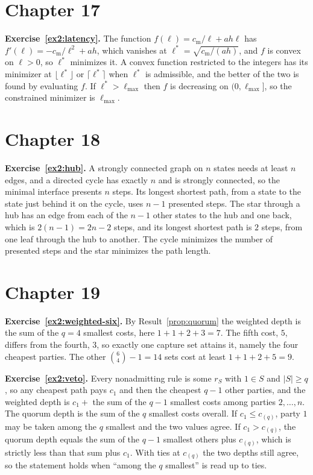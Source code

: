 \section*{Chapter 17}

\textbf{Exercise~\ref{ex2:latency}.} The function $f(\ell)=c_{\mathrm m}/\ell+ah\ell$ has $f'(\ell)=-c_{\mathrm m}/\ell^{2}+ah$, which vanishes at $\ell^{*}=\sqrt{c_{\mathrm m}/(ah)}$, and $f$ is convex on $\ell>0$, so $\ell^{*}$ minimizes it. A convex function restricted to the integers has its minimizer at $\lfloor\ell^{*}\rfloor$ or $\lceil\ell^{*}\rceil$ when $\ell^{*}$ is admissible, and the better of the two is found by evaluating $f$. If $\ell^{*}>\ell_{\max}$ then $f$ is decreasing on $(0,\ell_{\max}]$, so the constrained minimizer is $\ell_{\max}$.

\section*{Chapter 18}

\textbf{Exercise~\ref{ex2:hub}.} A strongly connected graph on $n$ states needs at least $n$ edges, and a directed cycle has exactly $n$ and is strongly connected, so the minimal interface presents $n$ steps. Its longest shortest path, from a state to the state just behind it on the cycle, uses $n-1$ presented steps. The star through a hub has an edge from each of the $n-1$ other states to the hub and one back, which is $2(n-1)=2n-2$ steps, and its longest shortest path is $2$ steps, from one leaf through the hub to another. The cycle minimizes the number of presented steps and the star minimizes the path length.

\section*{Chapter 19}

\textbf{Exercise~\ref{ex2:weighted-six}.} By Result~\ref{prop:quorum} the weighted depth is the sum of the $q=4$ smallest costs, here $1+1+2+3=7$. The fifth cost, $5$, differs from the fourth, $3$, so exactly one capture set attains it, namely the four cheapest parties. The other $\binom{6}{4}-1=14$ sets cost at least $1+1+2+5=9$.

\textbf{Exercise~\ref{ex2:veto}.} Every nonadmitting rule is some $r_S$ with $1\in S$ and $|S|\ge q$, so any cheapest path pays $c_1$ and then the cheapest $q-1$ other parties, and the weighted depth is $c_1+$ the sum of the $q-1$ smallest costs among parties $2,\dots,n$. The quorum depth is the sum of the $q$ smallest costs overall. If $c_1\le c_{(q)}$, party $1$ may be taken among the $q$ smallest and the two values agree. If $c_1>c_{(q)}$, the quorum depth equals the sum of the $q-1$ smallest others plus $c_{(q)}$, which is strictly less than that sum plus $c_1$. With ties at $c_{(q)}$ the two depths still agree, so the statement holds when ``among the $q$ smallest'' is read up to ties.

